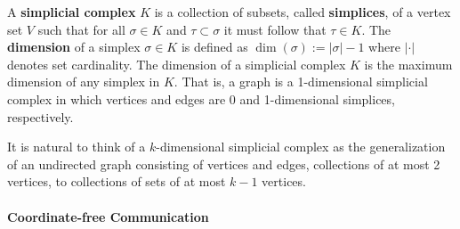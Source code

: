 

A \textbf{simplicial complex} $K$ is a collection of subsets, called \textbf{simplices}, of a vertex set $V$ such that for all $\sigma\in K$ and $\tau\subset\sigma$ it must follow that $\tau\in K$.
The \textbf{dimension} of a simplex $\sigma\in K$ is defined as $\dim(\sigma) := |\sigma|-1$ where $|\cdot|$ denotes set cardinality.
The dimension of a simplicial complex $K$ is the maximum dimension of any simplex in $K$.
That is, a graph is a 1-dimensional simplicial complex in which vertices and edges are 0 and 1-dimensional simplices, respectively.


It is natural to think of a $k$-dimensional simplicial complex as the generalization of an undirected graph consisting of vertices and edges, collections of at most 2 vertices, to collections of sets of at most $k-1$ vertices.

\paragraph{Coordinate-free Communication}

